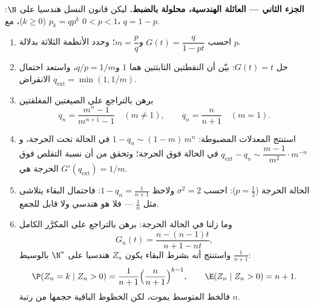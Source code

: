 \begin{problem}
\medskip
\noindent\textbf{الجزء الثاني --- العائلة الهندسية، محلولة
بالضبط.} ليكن قانون النسل هندسيا على $\N$: $p_k =
qp^k$ ($k \geq 0$)، مع
$0 < p < 1$، $q = 1 - p$.
\begin{enumerate}[resume]
  \item احسب $G(t) = \dfrac{q}{1 - pt}$ و$m = \dfrac
        pq$؛ وحدد الأنظمة الثلاثة بدلالة $p$.
  \item حل $G(t) = t$: بيّن أن النقطتين الثابتتين هما $1$ و$q/p = 1/m$،
        واستعد احتمال الانقراض $q_{\mathrm{ext}} = \min(1, 1/m)$.
  \item برهن بالتراجع على الصيغتين المغلقتين
        \[
        q_n = \frac{m^n - 1}{m^{n+1} - 1} \quad (m \neq 1),
        \qquad
        q_n = \frac{n}{n+1} \quad (m = 1).
        \]
  \item استنتج المعدلات المضبوطة: $1 - q_n \sim (1 - m)\,m^n$ في الحالة تحت الحرجة،
        و$q_{\mathrm{ext}} - q_n
        \sim \dfrac{m - 1}{m^{2}}\cdot m^{-n}$ في الحالة فوق الحرجة؛ وتحقق من أن نسبة التقلص فوق
        الحرجة هي $G'(q_{\mathrm{ext}}) = 1/m$.
  \item الحالة الحرجة ($p = \tfrac12$): احسب $\sigma^2 =
        2$ ولاحظ $1 - q_n = \frac1{n+1}$: فاحتمال
        البقاء يتلاشى مثل $\frac1n$ --- فلا هو هندسي ولا قابل للجمع.
  \item وما زلنا في الحالة الحرجة: برهن بالتراجع على المكرَّر الكامل
        \[
        G_n(t) = \frac{n - (n-1)t}{n + 1 - nt},
        \]
        واستنتج أنه بشرط البقاء يكون $Z_n$ هندسيا على $\N^*$
        بالوسيط $\frac1{n+1}$:
        \[
        \P(Z_n = k \mid Z_n > 0) = \frac1{n+1}
        \Bigl(\frac{n}{n+1}\Bigr)^{k-1},
        \qquad
        \E(Z_n \mid Z_n > 0) = n + 1 .
        \]
        فالخط المتوسط يموت، لكن الخطوط الباقية حجمها من رتبة $n$.
\end{enumerate}


\end{problem}
